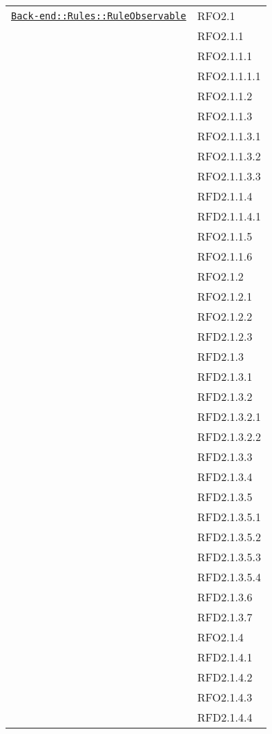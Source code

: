 \begin{longtable}{|>{\centering}m{10cm}|m{3cm}<{\centering}|}
\hyperref[Back-end::Rules::RuleObservable]{\texttt{Back-end::Rules::RuleObservable}} & RFO2.1\\
& RFO2.1.1\\
& RFO2.1.1.1\\
& RFO2.1.1.1.1\\
& RFO2.1.1.2\\
& RFO2.1.1.3\\
& RFO2.1.1.3.1\\
& RFO2.1.1.3.2\\
& RFO2.1.1.3.3\\
& RFD2.1.1.4\\
& RFD2.1.1.4.1\\
& RFO2.1.1.5\\
& RFO2.1.1.6\\
& RFO2.1.2\\
& RFO2.1.2.1\\
& RFO2.1.2.2\\
& RFD2.1.2.3\\
& RFD2.1.3\\
& RFD2.1.3.1\\
& RFD2.1.3.2\\
& RFD2.1.3.2.1\\
& RFD2.1.3.2.2\\
& RFD2.1.3.3\\
& RFD2.1.3.4\\
& RFD2.1.3.5\\
& RFD2.1.3.5.1\\
& RFD2.1.3.5.2\\
& RFD2.1.3.5.3\\
& RFD2.1.3.5.4\\
& RFD2.1.3.6\\
& RFD2.1.3.7\\
& RFO2.1.4\\
& RFD2.1.4.1\\
& RFD2.1.4.2\\
& RFO2.1.4.3\\
& RFD2.1.4.4\\ \hline


\end{longtable}
